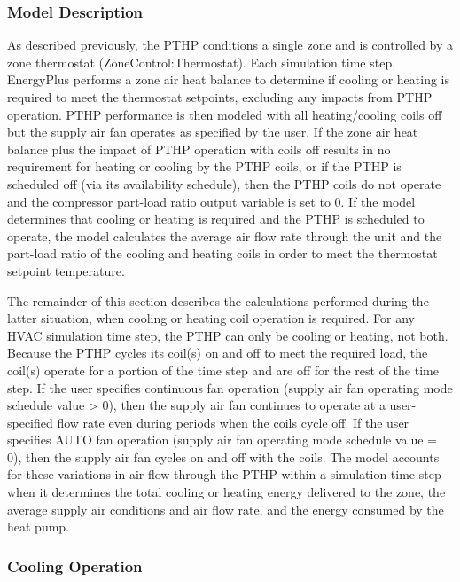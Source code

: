 \subsubsection{Model Description}\label{model-description-1-008}

As described previously, the PTHP conditions a single zone and is controlled by a zone thermostat (ZoneControl:Thermostat). Each simulation time step, EnergyPlus performs a zone air heat balance to determine if cooling or heating is required to meet the thermostat setpoints, excluding any impacts from PTHP operation. PTHP performance is then modeled with all heating/cooling coils off but the supply air fan operates as specified by the user. If the zone air heat balance plus the impact of PTHP operation with coils off results in no requirement for heating or cooling by the PTHP coils, or if the PTHP is scheduled off (via its availability schedule), then the PTHP coils do not operate and the compressor part-load ratio output variable is set to 0. If the model determines that cooling or heating is required and the PTHP is scheduled to operate, the model calculates the average air flow rate through the unit and the part-load ratio of the cooling and heating coils in order to meet the thermostat setpoint temperature.

The remainder of this section describes the calculations performed during the latter situation, when cooling or heating coil operation is required. For any HVAC simulation time step, the PTHP can only be cooling or heating, not both. Because the PTHP cycles its coil(s) on and off to meet the required load, the coil(s) operate for a portion of the time step and are off for the rest of the time step. If the user specifies continuous fan operation (supply air fan operating mode schedule value \textgreater{} 0), then the supply air fan continues to operate at a user-specified flow rate even during periods when the coils cycle off. If the user specifies AUTO fan operation (supply air fan operating mode schedule value = 0), then the supply air fan cycles on and off with the coils. The model accounts for these variations in air flow through the PTHP within a simulation time step when it determines the total cooling or heating energy delivered to the zone, the average supply air conditions and air flow rate, and the energy consumed by the heat pump.

\subsubsection{Cooling Operation}\label{cooling-operation-1-000}


